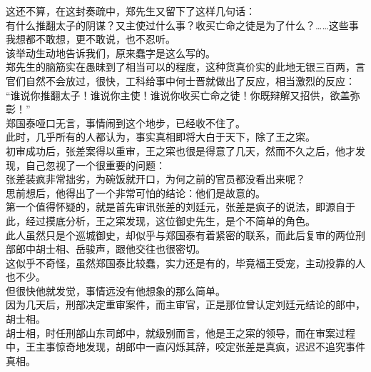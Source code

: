 \begin{multicols}{\theparacolNo}
这还不算，在这封奏疏中，郑先生又留下了这样几句话：\\

有什么推翻太子的阴谋？又主使过什么事？收买亡命之徒是为了什么？……这些事我想都不敢想，更不敢说，也不忍听。\\

该举动生动地告诉我们，原来蠢字是这么写的。\\

郑先生的脑筋实在愚昧到了相当可以的程度，这种货真价实的此地无银三百两，言官们自然不会放过，很快，工科给事中何士晋就做出了反应，相当激烈的反应：\\

“谁说你推翻太子！谁说你主使！谁说你收买亡命之徒！你既辩解又招供，欲盖弥彰！”\\

郑国泰哑口无言，事情闹到这个地步，已经收不住了。\\

此时，几乎所有的人都认为，事实真相即将大白于天下，除了王之寀。\\

初审成功后，张差案得以重审，王之寀也很是得意了几天，然而不久之后，他才发现，自己忽视了一个很重要的问题：\\

张差装疯非常拙劣，为碗饭就开口，为何之前的官员都没看出来呢？\\

思前想后，他得出了一个非常可怕的结论：他们是故意的。\\

第一个值得怀疑的，就是首先审讯张差的刘廷元，张差是疯子的说法，即源自于此，经过摸底分析，王之寀发现，这位御史先生，是个不简单的角色。\\

此人虽然只是个巡城御史，却似乎与郑国泰有着紧密的联系，而此后复审的两位刑部郎中胡士相、岳骏声，跟他交往也很密切。\\

这似乎不奇怪，虽然郑国泰比较蠢，实力还是有的，毕竟福王受宠，主动投靠的人也不少。\\

但很快他就发觉，事情远没有他想象的那么简单。\\

因为几天后，刑部决定重审案件，而主审官，正是那位曾认定刘廷元结论的郎中，胡士相。\\

胡士相，时任刑部山东司郎中，就级别而言，他是王之寀的领导，而在审案过程中，王主事惊奇地发现，胡郎中一直闪烁其辞，咬定张差是真疯，迟迟不追究事件真相。\\


\end{multicols}
